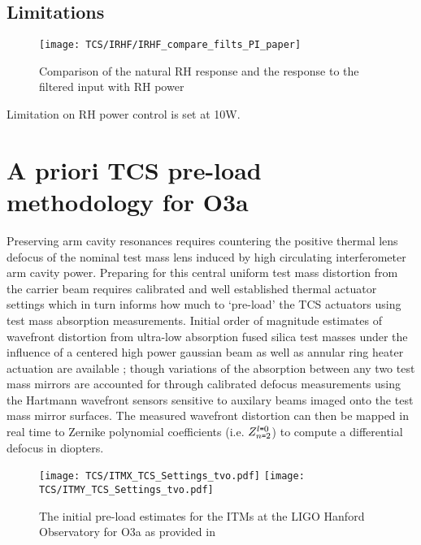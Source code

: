 \subsection{Limitations}
\begin{figure}[H]
    \centering
    \texttt{[image: TCS/IRHF/IRHF\_compare\_filts\_PI\_paper]}
    \caption{Comparison of the natural RH response and the response to the filtered input with RH power}
    \label{fig:RH_power}
\end{figure}
Limitation on RH power control is set at 10W. \cite{dcc:rhspec}

\section{A priori TCS pre-load methodology for O3a}
Preserving arm cavity resonances requires countering the positive thermal lens defocus of the nominal test mass lens induced by high circulating interferometer arm cavity power. Preparing for this central uniform test mass distortion from the carrier beam requires calibrated and well established thermal actuator settings which in turn informs how much to `pre-load' the TCS actuators using test mass absorption measurements. Initial order of magnitude estimates of wavefront distortion from ultra-low absorption fused silica test masses under the influence of a centered high power gaussian beam as well as annular ring heater actuation are available \cite{hellovinet:1990, ramette:2016}; though variations of the absorption between any two test mass mirrors are accounted for through calibrated defocus measurements using the Hartmann wavefront sensors sensitive to auxilary beams imaged onto the test mass mirror surfaces. The measured wavefront distortion can then be mapped in real time to Zernike polynomial coefficients (i.e. $Z^{l \texttt{=} 0}_{n \texttt{=} 2}$) to compute a differential defocus in diopters.

\begin{figure}[H]
  \centering
  \begin{subcaptiongroup}
	  \texttt{[image: TCS/ITMX\_TCS\_Settings\_tvo.pdf]}
	  \label{ITMX_TCS}
	  \texttt{[image: TCS/ITMY\_TCS\_Settings\_tvo.pdf]}
	  \label{ITMY_TCS}
  \end{subcaptiongroup}
  \captionsetup{subrefformat=parens}
  \hfill
  \caption{The initial pre-load estimates for the ITMs at the LIGO Hanford Observatory for O3a as provided in \cite{tvo}} 
  \label{fig:O3_preload_tvo}
\end{figure}

